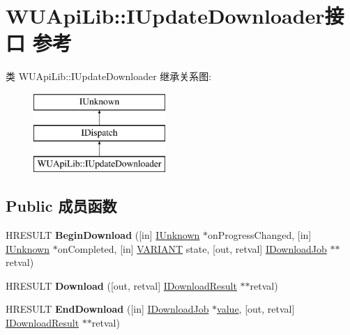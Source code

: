 \hypertarget{interface_w_u_api_lib_1_1_i_update_downloader}{}\section{W\+U\+Api\+Lib\+:\+:I\+Update\+Downloader接口 参考}
\label{interface_w_u_api_lib_1_1_i_update_downloader}
类 W\+U\+Api\+Lib\+:\+:I\+Update\+Downloader 继承关系图\+:\begin{figure}[H]
\begin{center}
\leavevmode
\includegraphics[height=3.000000cm]{interface_w_u_api_lib_1_1_i_update_downloader}
\end{center}
\end{figure}
\subsection*{Public 成员函数}
\begin{DoxyCompactItemize}
\item 
\mbox{\label{interface_w_u_api_lib_1_1_i_update_downloader_ac463364ac9995d6b7f6a243ed9c74cfc}} 
H\+R\+E\+S\+U\+LT {\bfseries Begin\+Download} (\mbox{[}in\mbox{]} \hyperlink{interface_i_unknown}{I\+Unknown} $\ast$on\+Progress\+Changed, \mbox{[}in\mbox{]} \hyperlink{interface_i_unknown}{I\+Unknown} $\ast$on\+Completed, \mbox{[}in\mbox{]} \hyperlink{structtag_v_a_r_i_a_n_t}{V\+A\+R\+I\+A\+NT} state, \mbox{[}out, retval\mbox{]} \hyperlink{interface_w_u_api_lib_1_1_i_download_job}{I\+Download\+Job} $\ast$$\ast$retval)
\item 
\mbox{\label{interface_w_u_api_lib_1_1_i_update_downloader_aeb81115f2ba00bbe01f5bab65ec843a8}} 
H\+R\+E\+S\+U\+LT {\bfseries Download} (\mbox{[}out, retval\mbox{]} \hyperlink{interface_w_u_api_lib_1_1_i_download_result}{I\+Download\+Result} $\ast$$\ast$retval)
\item 
\mbox{\label{interface_w_u_api_lib_1_1_i_update_downloader_a26077ea1046c5abe72e65782773b3363}} 
H\+R\+E\+S\+U\+LT {\bfseries End\+Download} (\mbox{[}in\mbox{]} \hyperlink{interface_w_u_api_lib_1_1_i_download_job}{I\+Download\+Job} $\ast$\hyperlink{unionvalue}{value}, \mbox{[}out, retval\mbox{]} \hyperlink{interface_w_u_api_lib_1_1_i_download_result}{I\+Download\+Result} $\ast$$\ast$retval)
\end{DoxyCompactItemize}
